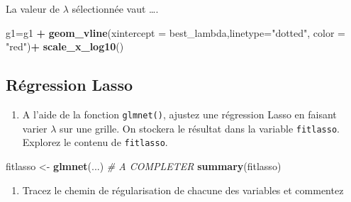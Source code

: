 \documentclass[
]{article}
\newenvironment{Shaded}{\begin{snugshade}}{\end{snugshade}}
\newcommand{\AttributeTok}[1]{\textcolor[rgb]{0.13,0.29,0.53}{#1}}
\newcommand{\CommentTok}[1]{\textcolor[rgb]{0.56,0.35,0.01}{\textit{#1}}}
\newcommand{\FunctionTok}[1]{\textcolor[rgb]{0.13,0.29,0.53}{\textbf{#1}}}
\newcommand{\NormalTok}[1]{#1}
\newcommand{\OtherTok}[1]{\textcolor[rgb]{0.56,0.35,0.01}{#1}}
\newcommand{\SpecialCharTok}[1]{\textcolor[rgb]{0.81,0.36,0.00}{\textbf{#1}}}
\newcommand{\StringTok}[1]{\textcolor[rgb]{0.31,0.60,0.02}{#1}}
\providecommand{\tightlist}{%
  \setlength{\itemsep}{0pt}\setlength{\parskip}{0pt}}
\begin{document}
La valeur de \(\lambda\) sélectionnée vaut \ldots.

\begin{Shaded}
\begin{Highlighting}[]
\NormalTok{g1}\OtherTok{=}\NormalTok{g1 }\SpecialCharTok{+} 
  \FunctionTok{geom\_vline}\NormalTok{(}\AttributeTok{xintercept =}\NormalTok{ best\_lambda,}\AttributeTok{linetype=}\StringTok{"dotted"}\NormalTok{, }\AttributeTok{color =} \StringTok{"red"}\NormalTok{)}\SpecialCharTok{+}
  \FunctionTok{scale\_x\_log10}\NormalTok{()}
\end{Highlighting}
\end{Shaded}

\hypertarget{ruxe9gression-lasso}{%
\subsection{Régression Lasso}\label{ruxe9gression-lasso}}

\begin{enumerate}
\def\labelenumi{\arabic{enumi}.}
\tightlist
\item
  A l'aide de la fonction \texttt{glmnet()}, ajustez une régression
  Lasso en faisant varier \(\lambda\) sur une grille. On stockera le
  résultat dans la variable \texttt{fitlasso}. Explorez le contenu de
  \texttt{fitlasso}.
\end{enumerate}

\begin{Shaded}
\begin{Highlighting}[]
\NormalTok{fitlasso }\OtherTok{\textless{}{-}} \FunctionTok{glmnet}\NormalTok{(...) }\CommentTok{\# A COMPLETER}
\FunctionTok{summary}\NormalTok{(fitlasso)}
\end{Highlighting}
\end{Shaded}

\begin{enumerate}
\def\labelenumi{\arabic{enumi}.}
\setcounter{enumi}{1}
\tightlist
\item
  Tracez le chemin de régularisation de chacune des variables et
  commentez
\end{enumerate}
\end{document}
